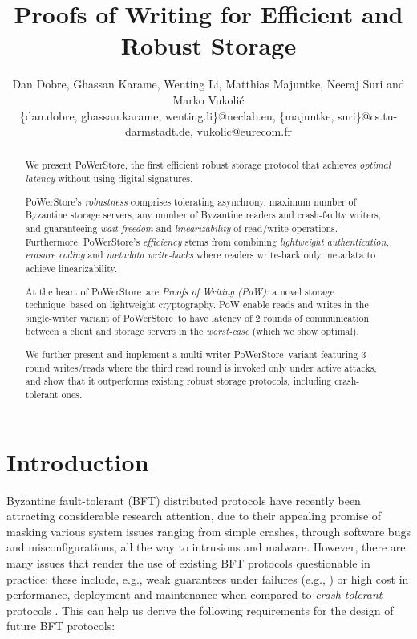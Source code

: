 \documentclass[10pt,conference,compsocconf]{IEEEtran}
\title{Proofs of Writing for Efficient and Robust Storage}
\author{Dan Dobre, Ghassan Karame, Wenting Li, Matthias Majuntke, Neeraj Suri and Marko Vukoli\'{c} \\
\{dan.dobre, ghassan.karame, wenting.li\}@neclab.eu,  \{majuntke, suri\}@cs.tu-darmstadt.de, vukolic@eurecom.fr}
\newcommand{\protocol}{PoWerStore}
\newcommand{\scheme}{storage technique}
\begin{document}
\maketitle
\thispagestyle{plain}
\pagestyle{plain}

\begin{abstract}







We present \protocol, the first efficient robust storage protocol that
achieves \emph{optimal latency} without using digital signatures.

\protocol's \emph{robustness} comprises  tolerating asynchrony, maximum
number of Byzantine storage servers, any number of Byzantine readers
and crash-faulty writers, and guaranteeing \emph{wait-freedom} and
\emph{linearizability} of read/write operations. Furthermore,
\protocol's \emph{efficiency} stems from combining \emph{lightweight
authentication}, \emph{erasure coding} and \emph{metadata write-backs}
where readers write-back only metadata to achieve linearizability.


At the heart of \protocol\ are \emph{Proofs of Writing (PoW)}: a novel
\scheme\ based on lightweight cryptography. PoW enable reads and
writes in the single-writer variant of \protocol\ to have latency of
2 rounds of communication between a client and storage servers in the
\emph{worst-case} (which we show optimal).

We further present and implement a multi-writer \protocol\ variant
featuring 3-round writes/reads where the third read round is invoked
only under active attacks, and show that it outperforms existing
robust storage protocols, including crash-tolerant ones.









\end{abstract}

\section{Introduction}


Byzantine fault-tolerant (BFT) distributed protocols have recently been attracting considerable research attention, due to their appealing promise of masking various system issues ranging from simple crashes, through software bugs and misconfigurations, all the way to intrusions and malware. However, there are many issues that render the use of existing BFT protocols questionable in practice; these include, e.g., weak guarantees under failures (e.g., \cite{SinghDMDR08,CWADM09,AmirCKL11}) or high cost in performance, deployment and maintenance when compared to \emph{crash-tolerant} protocols \cite{KR09}. This can help us derive the following requirements for the design of future BFT protocols:
\end{document}
